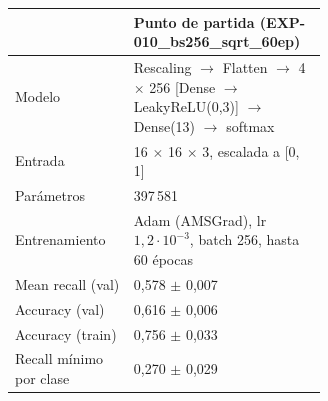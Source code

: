 \begin{tabular}{lp{0.62\linewidth}}
\toprule
 & Punto de partida (EXP-010\_bs256\_sqrt\_60ep) \\
\midrule
Modelo & Rescaling $\rightarrow$ Flatten $\rightarrow$ 4 $\times$ 256 [Dense $\rightarrow$ LeakyReLU(0,3)] $\rightarrow$ Dense(13) $\rightarrow$ softmax \\
Entrada & 16 $\times$ 16 $\times$ 3, escalada a [0, 1] \\
Parámetros & 397\,581 \\
Entrenamiento & Adam (AMSGrad), lr $1{,}2\cdot 10^{-3}$, batch 256, hasta 60 épocas \\
Mean recall (val) & 0,578 $\pm$ 0,007 \\
Accuracy (val) & 0,616 $\pm$ 0,006 \\
Accuracy (train) & 0,756 $\pm$ 0,033 \\
Recall mínimo por clase & 0,270 $\pm$ 0,029 \\
\bottomrule
\end{tabular}
